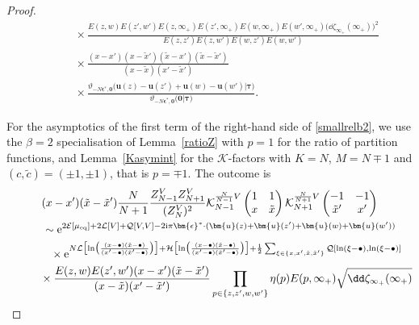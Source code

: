 \documentclass[10pt,a4paper]{amsart}
\numberwithin{equation}{section}
\begin{document}
\begin{proof}
\begin{gather}
\qquad\quad{} \times{}\frac{E(z,w)E(z',w')E(z,\infty_+)E(z',\infty_+)E(w,\infty_+)E(w',\infty_+)\bigl(\dd \zeta_{\infty_+}(\infty_+)\bigr)^2}{E(z,z')E(z,w')E(w,z')E(w,w')}\nonumber\\
\qquad\quad{} \times{}\frac{(x - x')(x - \tilde{x}')(\tilde{x} - x')(\tilde{x} - \tilde{x}')}{(x - \tilde{x})(x' - \tilde{x}')} \nonumber\\
\qquad\quad{} \times{} \frac{\vartheta_{-N\bm{\epsilon}^*,\bm{0}}\bigl(\bm{u}(z) - \bm{u}(z') + \bm{u}(w) - \bm{u}(w')\big|\bm{\tau}\bigr)}{\vartheta_{-N\bm{\epsilon}^*,\bm{0}}\bigl(\bm{0}\big|\bm{\tau}\bigr)}.\label{T1}
\end{gather}

For the asymptotics of the first term of the right-hand side of \eqref{smallrelb2}, we use the $\beta = 2$ specialisation of Lemma~\ref{ratioZ} with $p = 1$ for the ratio of partition functions, and Lemma~\ref{Kasymint} for the $\mathcal{K}$-factors with $K = N$, $M = N \mp 1$ and $(c,\tilde{c}) = (\pm 1,\pm 1)$, that is $p = \mp 1$. The outcome is
\begin{gather}
  (x - x')(\tilde{x} - \tilde{x}')\frac{N}{N + 1} \frac{Z_{N - 1}^{V}Z_{N + 1}^{V}}{(Z_N^V)^2} \mathcal{K}^{\frac{N}{N - 1}V}_{N - 1}\left(\begin{matrix} 1 & 1 \\ x & \tilde{x} \end{matrix}\right) \mathcal{K}^{\frac{N}{N + 1}V}_{N + 1}\left(\begin{matrix} -1 & -1 \\ \tilde{x}' & x' \end{matrix}\right) \nonumber \\
 \qquad \sim{\rm e}^{2\mathcal{E}[\mu_{{\rm eq}}] + 2\mathcal{L}[V] + \mathcal{Q}[V,V] - 2{\rm i}\pi \bm{\epsilon}^* \cdot(\bm{u}(z) + \bm{u}(z') + \bm{u}(w) + \bm{u}(w'))} \nonumber \\
\qquad\quad {}\times{\rm e}^{N\mathcal{L}\bigl[\ln\bigl(\frac{(x - \bullet)(\tilde{x} - \bullet)}{(x' - \bullet)(\tilde{x}' - \bullet)}\bigr)\bigr] + \mathcal{H}\bigl[\ln\bigl(\frac{(x - \bullet)(\tilde{x} - \bullet)}{(x' - \bullet)(\tilde{x}' - \bullet)}\bigr)\bigr] + \frac{1}{2} \sum_{\xi \in \{x,x',\tilde{x},\tilde{x}'\}} \mathcal{Q}[\ln(\xi - \bullet),\ln(\xi - \bullet)]} \nonumber\\
\qquad\quad {}  \times \frac{E(z,w)E(z',w')(x - x')(\tilde{x} - \tilde{x}')}{(x - \tilde{x})(x' - \tilde{x}')} \prod_{p \in \{z,z',w,w'\}} \eta(p)E(p,\infty_+) \sqrt{\dd \zeta_{\infty_+}(\infty_+)}\nonumber\\

\end{gather}
\end{proof}
\end{document}
